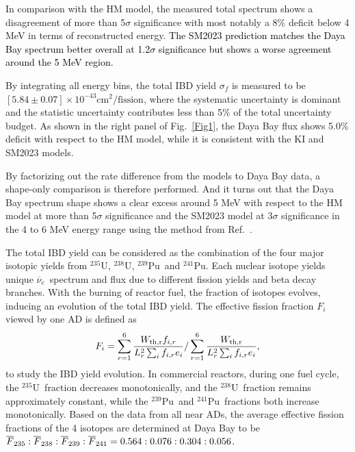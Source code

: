 \documentclass[aps,prl,showpacs,showkeys,amsmath,amssymb,twocolumn,floatfix,superscriptaddress,nofootinbib]{revtex4-1}
\newcommand{\black}{\textcolor{black}}
\newcommand{\Rnu}{$\overline{\nu}_e$}
\newcommand{\Ufive}{$\mathrm{^{235}U}$}
\newcommand{\Ueight}{$\mathrm{^{238}U}$}
\newcommand{\Punine}{$\mathrm{^{239}Pu}$}
\newcommand{\Puone}{$\mathrm{^{241}Pu}$}
\begin{document}
In comparison with the HM model, the measured total spectrum shows a disagreement of more than 5$\sigma$ significance with most notably a 8$\%$ deficit below 4 MeV in terms of reconstructed energy.
\black{The SM2023 prediction matches the Daya Bay spectrum better overall at 1.2$\sigma$ significance but shows a worse agreement around the 5 MeV region.}

By integrating all energy bins, the total IBD yield $\sigma_f$ is measured to be $[5.84 \pm0.07] \times 10^{-43} \mathrm{cm^2/fission}$, where the systematic uncertainty is dominant and the statistic uncertainty contributes less than 5$\%$ of the total uncertainty budget.
As shown in the right panel of Fig.~\ref{Fig1}, the Daya Bay flux shows 5.0$\%$ deficit with respect to the HM model, while it is consistent with the KI and SM2023 models.

By factorizing out the rate difference from the models to Daya Bay data, a shape-only comparison is therefore performed.
And it turns out that the Daya Bay spectrum shape shows a clear excess around 5 MeV with respect to the HM model at more than 5$\sigma$ significance and the SM2023 model at 3$\sigma$ significance in the 4 to 6 MeV energy range using the method from Ref.~\cite{DayaBay_CPC_2016}.






The total IBD yield can be considered as the combination of the four major isotopic yields from \Ufive, \Ueight, \Punine\ and \Puone .
Each nuclear isotope yields unique \Rnu\ spectrum and flux due to different fission yields and beta decay branches.
With the burning of reactor fuel, the fraction of isotopes evolves, inducing an evolution of the total IBD yield.
The effective fission fraction $F_{i}$ viewed by one AD is defined as
\begin{eqnarray}
    F_{i} =  \sum_{r=1}^{6} \dfrac{W_{\rm{th},r} f_{i,r}}{L_{r}^{2} \sum_{i}^{} f_{i,r} e_{i} } / \sum_{r=1}^{6} \dfrac{W_{\rm{th},r}}{L_{r}^{2} \sum_{i}^{} f_{i,r} e_{i} },
\label{eqEff_Fiss_Frac}
\end{eqnarray}
to study the IBD yield evolution.
In commercial reactors, during one fuel cycle, the \Ufive\ fraction decreases monotonically,  and the \Ueight\ fraction remains approximately constant, while the \Punine\ and \Puone\ fractions both increase monotonically.
Based on the data from all near ADs, the average effective fission fractions of the 4 isotopes are determined at Daya Bay to be $ \overline{F}_{235} : \overline{F}_{238} : \overline{F}_{239} : \overline{F}_{241} = \black{0.564 : 0.076 : 0.304 : 0.056} $.
\end{document}
